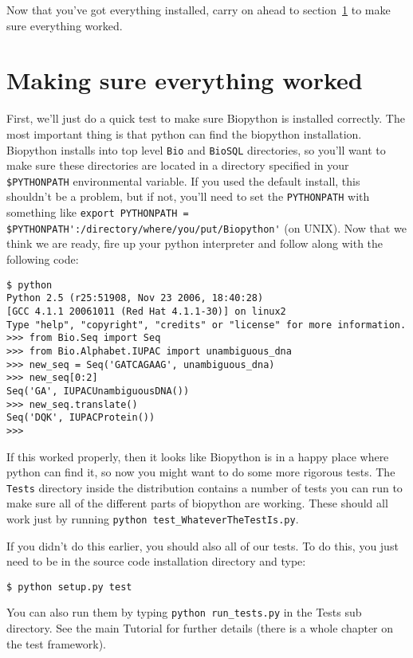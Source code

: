 \documentclass{article}
\begin{document}
Now that you've got everything installed, carry on ahead to section~\ref{sec:is_working} to make sure everything worked.

\section{Making sure everything worked}
\label{sec:is_working}

First, we'll just do a quick test to make sure Biopython is installed correctly. The most important thing is that python can find the biopython installation. Biopython installs into top level \verb|Bio| and \verb|BioSQL| directories, so you'll want to make sure these directories are located in a directory specified 
in your\verb| $PYTHONPATH| environmental variable. If you used the default install, this shouldn't be a problem, but if not, you'll need to set the \verb|PYTHONPATH| with something like \verb|export PYTHONPATH = $PYTHONPATH':/directory/where/you/put/Biopython'| (on UNIX). Now that we think we are ready, fire up your python interpreter and follow along with the following code:

\begin{verbatim}
$ python
Python 2.5 (r25:51908, Nov 23 2006, 18:40:28) 
[GCC 4.1.1 20061011 (Red Hat 4.1.1-30)] on linux2
Type "help", "copyright", "credits" or "license" for more information.
>>> from Bio.Seq import Seq
>>> from Bio.Alphabet.IUPAC import unambiguous_dna
>>> new_seq = Seq('GATCAGAAG', unambiguous_dna)
>>> new_seq[0:2]
Seq('GA', IUPACUnambiguousDNA())
>>> new_seq.translate()
Seq('DQK', IUPACProtein())
>>>
\end{verbatim}

If this worked properly, then it looks like Biopython is in a happy place where python can find it, so now you might want to do some more rigorous tests. The \verb|Tests| directory inside the distribution contains a number of tests you can run to make sure all of the different parts of biopython are working. These should all work just by running \verb|python test_WhateverTheTestIs.py|. 

If you didn't do this earlier, you should also all of our tests. To do this, you just need to be in the source code installation directory and type:

\begin{verbatim}
$ python setup.py test
\end{verbatim}

You can also run them by typing \verb|python run_tests.py| in the Tests sub directory.
See the main Tutorial for further details (there is a whole chapter on the test framework).
\end{document}
